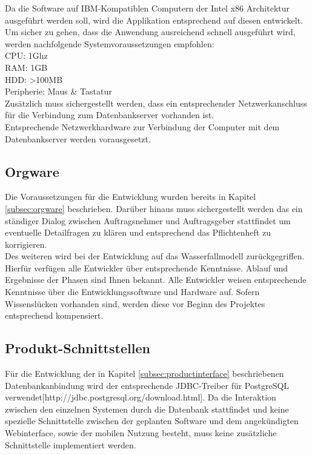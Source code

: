 Da die Software auf IBM-Kompatiblen Computern der Intel x86 Architektur ausgeführt werden soll, wird die Applikation entsprechend auf diesen entwickelt.
Um sicher zu gehen, dass die Anwendung ausreichend schnell ausgeführt wird, werden nachfolgende Systemvoraussetzungen empfohlen:\\

CPU: 1Ghz\\
RAM: 1GB\\
HDD: >100MB\\
Peripherie: Maus \& Tastatur\\

Zusätzlich muss sichergestellt werden, dass ein entsprechender Netzwerkanschluss für die Verbindung zum Datenbankserver vorhanden ist.\\

Entsprechende Netzwerkhardware zur Verbindung der Computer mit dem Datenbankserver werden vorausgesetzt.\\

\subsection{Orgware}
\label{subsec:devorgware}

Die Voraussetzungen für die Entwicklung wurden bereits in Kapitel \ref{subsec:orgware} beschrieben.
Darüber hinaus muss sichergestellt werden das ein ständiger Dialog zwischen Auftragsnehmer und Auftragsgeber stattfindet um eventuelle Detailfragen zu klären und entsprechend das Pflichtenheft zu korrigieren.\\

Des weiteren wird bei der Entwicklung auf das Wasserfallmodell zurückgegriffen. Hierfür verfügen alle Entwickler über entsprechende Kenntnisse. Ablauf und Ergebnisse der Phasen sind Ihnen bekannt. Alle Entwickler weisen entsprechende Kenntnisse über die Entwicklungssoftware und Hardware auf. Sofern Wissenslücken vorhanden sind, werden diese vor Beginn des Projektes entsprechend kompensiert.



\subsection{Produkt-Schnittstellen}

Für die Entwicklung der in Kapitel \ref{subsec:productinterface} beschriebenen Datenbankanbindung wird der entsprechende JDBC-Treiber für PostgreSQL verwendet[http://jdbc.postgresql.org/download.html].
Da die Interaktion zwischen den einzelnen Systemen durch die Datenbank stattfindet und keine spezielle Schnittstelle zwischen der geplanten Software und dem angekündigten Webinterface, sowie der mobilen Nutzung besteht, muss keine zusätzliche Schnittstelle implementiert werden.\\